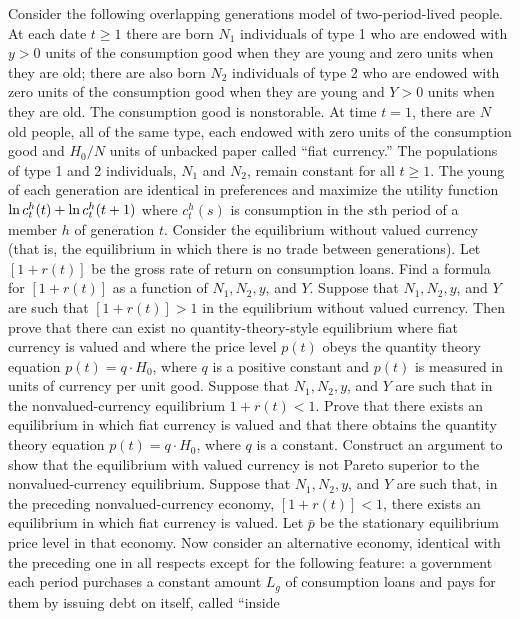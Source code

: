 \noindent Consider the following overlapping generations model of two-period-lived
people.  At each date $t\ge 1$ there are born $N_1$ individuals of type 1 who
are endowed with $y>0$ units of the consumption good when they are young and
zero units when they are old; there are also born $N_2$ individuals of type 2
who are endowed with zero units of the consumption good when they are young and
$Y>0$ units when they are old.  The consumption good is nonstorable.  At time
$t=1$, there are $N$ old people, all of the same type, each endowed with zero
units of the consumption good and $H_0/N$ units of unbacked paper called ``fiat
currency.'' The populations of type 1 and 2 individuals, $N_1$ and $N_2$,
remain constant for all $t\ge 1$.  The young of each generation are identical
in preferences and maximize the utility function $\mathop{\hbox{ln}} c_t^h(t) +\mathop{\hbox{ln}}
c_t^h({t+1})$ where $c_t^h(s)$ is consumption in the $s$th period of a member
$h$ of generation $t$.
\medskip
{} Consider the equilibrium without valued currency (that is, the
equilibrium in which there is no trade between generations).  Let $[1+r(t)]$ be
the gross rate of return on consumption loans.  Find a formula for $[1+r(t)]$
as a function of $N_1, N_2,y$, and $Y$.\medskip
{} Suppose that $N_1,N_2,y$,
 and $Y$ are such that $[1+r(t)]>1$ in the
equilibrium without valued currency.  Then prove that there can
exist no quantity-theory-style equilibrium where fiat currency is
valued and where the price level $p(t)$ obeys the quantity theory
equation $p(t)=q\cdot H_0$, where $q$ is a positive constant and
$p(t)$ is measured in units of currency per unit good.
\medskip
{} Suppose that $N_1,N_2,y$, and $Y$ are such that in the
nonvalued-currency equilibrium $1+r(t)<1$.  Prove that there
exists an equilibrium in which fiat currency is valued and that
there obtains the quantity theory equation $p(t)=q\cdot H_0$,
where $q$ is a constant.  Construct an argument to show that the
equilibrium with valued currency is not Pareto superior to the
nonvalued-currency equilibrium.
\medskip {} Suppose that
$N_1,N_2,y$, and $Y$ are such that, in the preceding
nonvalued-currency economy, $[1+r(t)]<1$, there exists an
equilibrium in  which fiat currency is valued.  Let $\bar p$ be
the stationary equilibrium price level in that economy.  Now
consider an alternative economy, identical with the preceding one
in all respects except for the following feature: a government
each period purchases a constant amount $L_g$ of consumption loans
and pays for them by issuing debt on itself, called ``inside
